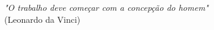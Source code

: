 
\begin{titlepage}
  \vspace*{\fill}
  \hspace{.45\textwidth}
  \begin{minipage}[b]{.5\textwidth}
    \begin{flushright}
      \textit{"O trabalho deve começar com a concepção do homem"}\\(Leonardo da Vinci)
    \end{flushright}
  \end{minipage}
\end{titlepage}
